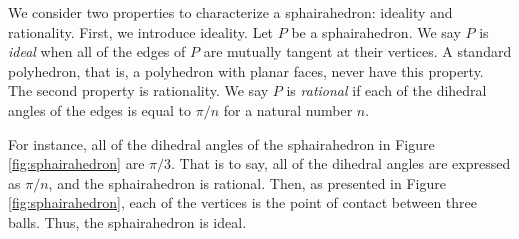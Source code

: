 We consider two properties to characterize a sphairahedron:
ideality and rationality.
First, we introduce ideality.
Let $P$ be a sphairahedron. We say $P$ is \textit{ideal} when all of the edges of
$P$ are mutually tangent at their vertices.
A standard polyhedron, that is, a polyhedron with planar faces, never have this property.
The second property is rationality.
We say $P$ is \textit{rational} if each of the
dihedral angles of the edges is equal to $\pi / n$ for a natural number
$n$.

For instance, all of the dihedral angles of the sphairahedron
in Figure \ref{fig:sphairahedron} are $\pi / 3$.
That is to say, all of the dihedral angles are expressed as
$\pi /n$, and the sphairahedron is rational.
Then, as presented in Figure
\ref{fig:sphairahedron}, each of the vertices is
the point of contact between three balls.
Thus, the sphairahedron is ideal.

